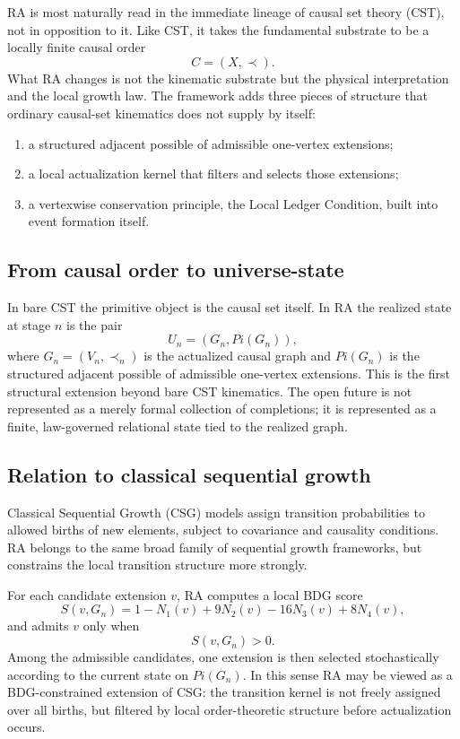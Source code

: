\documentclass[11pt]{article}
\def\Pi{Pi}%
\begin{document}
RA is most naturally read in the immediate lineage of causal set theory (CST), not in opposition to it.
Like CST, it takes the fundamental substrate to be a locally finite causal order
\[
C=(X,\prec).
\]
What RA changes is not the kinematic substrate but the physical interpretation and the local growth law.
The framework adds three pieces of structure that ordinary causal-set kinematics does not supply by itself:
\begin{enumerate}[label=(\roman*)]
\item a structured adjacent possible of admissible one-vertex extensions;
\item a local actualization kernel that filters and selects those extensions;
\item a vertexwise conservation principle, the Local Ledger Condition, built into event formation itself.
\end{enumerate}

\subsection{From causal order to universe-state}

In bare CST the primitive object is the causal set itself. In RA the realized state at stage $n$ is the pair
\[
U_n=(G_n,\Pi(G_n)),
\]
where $G_n=(V_n,\prec_n)$ is the actualized causal graph and $\Pi(G_n)$ is the structured adjacent possible of admissible one-vertex extensions. This is the first structural extension beyond bare CST kinematics. The open future is not represented as a merely formal collection of completions; it is represented as a finite, law-governed relational state tied to the realized graph.

\subsection{Relation to classical sequential growth}

Classical Sequential Growth (CSG) models assign transition probabilities to allowed births of new elements, subject to covariance and causality conditions. RA belongs to the same broad family of sequential growth frameworks, but constrains the local transition structure more strongly.

For each candidate extension $v$, RA computes a local BDG score
\[
S(v,G_n)=1-N_1(v)+9N_2(v)-16N_3(v)+8N_4(v),
\]
and admits $v$ only when
\[
S(v,G_n)>0.
\]
Among the admissible candidates, one extension is then selected stochastically according to the current state on $\Pi(G_n)$. In this sense RA may be viewed as a BDG-constrained extension of CSG: the transition kernel is not freely assigned over all births, but filtered by local order-theoretic structure before actualization occurs.
\end{document}
